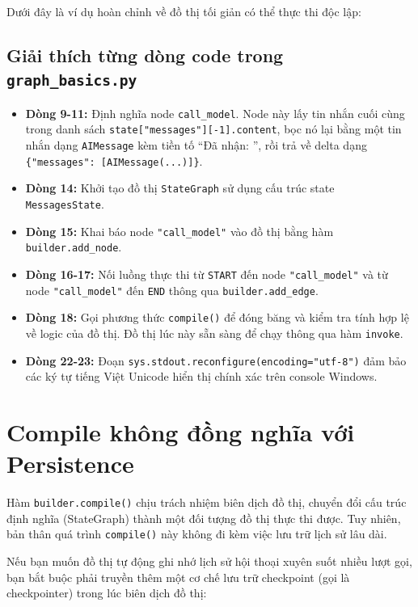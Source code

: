 Dưới đây là ví dụ hoàn chỉnh về đồ thị tối giản có thể thực thi độc lập:

\begingroup

\endgroup

\subsection{Giải thích từng dòng code trong \texttt{graph\_basics.py}}
\begin{itemize}
  \item \textbf{Dòng 9-11:} Định nghĩa node \texttt{call\_model}. Node này lấy tin nhắn cuối cùng trong danh sách \texttt{state["messages"][-1].content}, bọc nó lại bằng một tin nhắn dạng \texttt{AIMessage} kèm tiền tố ``Đã nhận: '', rồi trả về delta dạng \texttt{\{"messages": [AIMessage(...)]\}}.
  \item \textbf{Dòng 14:} Khởi tạo đồ thị \texttt{StateGraph} sử dụng cấu trúc state \texttt{MessagesState}.
  \item \textbf{Dòng 15:} Khai báo node \texttt{"call\_model"} vào đồ thị bằng hàm \texttt{builder.add\_node}.
  \item \textbf{Dòng 16-17:} Nối luồng thực thi từ \texttt{START} đến node \texttt{"call\_model"} và từ node \texttt{"call\_model"} đến \texttt{END} thông qua \texttt{builder.add\_edge}.
  \item \textbf{Dòng 18:} Gọi phương thức \texttt{compile()} để đóng băng và kiểm tra tính hợp lệ về logic của đồ thị. Đồ thị lúc này sẵn sàng để chạy thông qua hàm \texttt{invoke}.
  \item \textbf{Dòng 22-23:} Đoạn \texttt{sys.stdout.reconfigure(encoding="utf-8")} đảm bảo các ký tự tiếng Việt Unicode hiển thị chính xác trên console Windows.
\end{itemize}

\section{Compile không đồng nghĩa với Persistence}

Hàm \texttt{builder.compile()} chịu trách nhiệm biên dịch đồ thị, chuyển đổi cấu trúc định nghĩa (StateGraph) thành một đối tượng đồ thị thực thi được. Tuy nhiên, bản thân quá trình \texttt{compile()} này không đi kèm việc lưu trữ lịch sử lâu dài. 

Nếu bạn muốn đồ thị tự động ghi nhớ lịch sử hội thoại xuyên suốt nhiều lượt gọi, bạn bắt buộc phải truyền thêm một cơ chế lưu trữ checkpoint (gọi là checkpointer) trong lúc biên dịch đồ thị:

